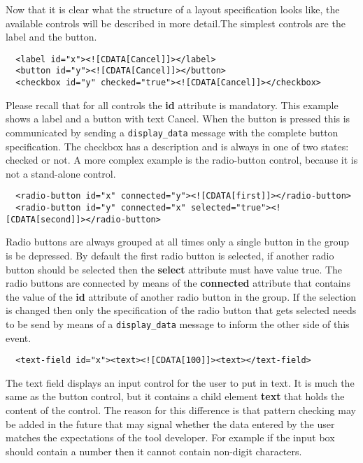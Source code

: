 \documentclass{article}
\newcommand{\msg}[1]{\texttt{#1}}
\begin{document}
   Now that it is clear what the structure of a layout specification looks
   like, the available controls will be described in more detail.The simplest
   controls are the label and the button.

    \begin{verbatim}
  <label id="x"><![CDATA[Cancel]]></label>
  <button id="y"><![CDATA[Cancel]]></button>
  <checkbox id="y" checked="true"><![CDATA[Cancel]]></checkbox>\end{verbatim}

   Please recall that for all controls the \textbf{id} attribute is mandatory.
   This example shows a label and a button with text Cancel. When the button is
   pressed this is communicated by sending a \msg{display\_data} message with the
   complete button specification. The checkbox has a description and is always
   in one of two states: checked or not. A more complex example is the
   radio-button control, because it is not a stand-alone control.

    \begin{verbatim}
  <radio-button id="x" connected="y"><![CDATA[first]]></radio-button>
  <radio-button id="y" connected="x" selected="true"><![CDATA[second]]></radio-button>\end{verbatim}

   Radio buttons are always grouped at all times only a single button in the
   group is be depressed.  By default the first radio button is selected, if
   another radio button should be selected then the \textbf{select} attribute
   must have value true. The radio buttons are connected by means of the
   \textbf{connected} attribute that contains the value of the \textbf{id}
   attribute of another radio button in the group. If the selection is changed
   then only the specification of the radio button that gets selected needs to
   be send by means of a \msg{display\_data} message to inform the other side
   of this event.

    \begin{verbatim}
  <text-field id="x"><text><![CDATA[100]]><text></text-field>\end{verbatim}

   The text field displays an input control for the user to put in text. It is
   much the same as the button control, but it contains a child element
   \textbf{text} that holds the content of the control. The reason for this
   difference is that pattern checking may be added in the future that may
   signal whether the data entered by the user matches the expectations of the
   tool developer. For example if the input box should contain a number then it
   cannot contain non-digit characters.
\end{document}
